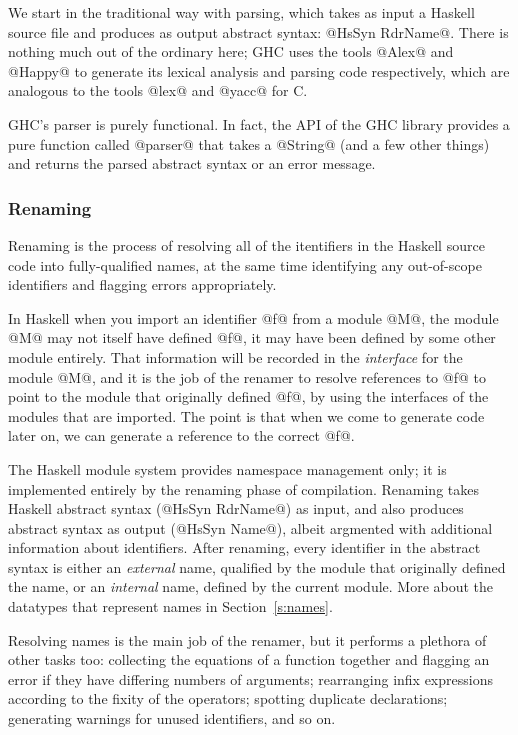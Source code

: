 \documentclass{article}
\begin{document}
We start in the traditional way with parsing, which takes as input a
Haskell source file and produces as output abstract syntax: @HsSyn RdrName@.
There is nothing much out of the ordinary here; GHC uses the tools @Alex@ and
@Happy@ to generate its lexical analysis and parsing code
respectively, which are analogous to the tools @lex@ and @yacc@ for C.

GHC's parser is purely functional.  In fact, the API of the GHC
library provides a pure function called @parser@ that takes a @String@
(and a few other things) and returns the parsed abstract syntax or an
error message.

\subsubsection{Renaming}

Renaming is the process of resolving all of the itentifiers in the
Haskell source code into fully-qualified names, at the same time
identifying any out-of-scope identifiers and flagging errors
appropriately.

In Haskell when you import an identifier @f@ from a module @M@, the
module @M@ may not itself have defined @f@, it may have been defined
by some other module entirely.  That information will be recorded in
the \emph{interface} for the module @M@, and it is the job of the
renamer to resolve references to @f@ to point to the module that
originally defined @f@, by using the interfaces of the modules that
are imported.  The point is that when we come to generate code later
on, we can generate a reference to the correct @f@.

The Haskell module system provides namespace management only; it is
implemented entirely by the renaming phase of compilation.  Renaming
takes Haskell abstract syntax (@HsSyn RdrName@) as input, and also
produces abstract syntax as output (@HsSyn Name@), albeit argmented
with additional information about identifiers.  After renaming, every
identifier in the abstract syntax is either an \emph{external} name,
qualified by the module that originally defined the name, or an
\emph{internal} name, defined by the current module.  More about the
datatypes that represent names in Section~\ref{s:names}.

Resolving names is the main job of the renamer, but it performs a
plethora of other tasks too: collecting the equations of a function
together and flagging an error if they have differing numbers of
arguments; rearranging infix expressions according to the fixity of
the operators; spotting duplicate declarations; generating warnings
for unused identifiers, and so on.
\end{document}
